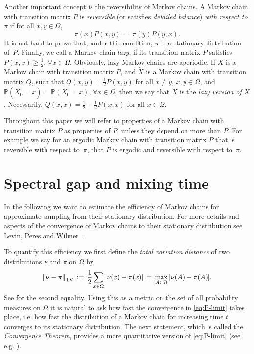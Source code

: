 \documentclass{dis}
\theoremstyle{citing}
\begin{document}
Another important concept is the reversibility of Markov chains. 
A Markov chain with transition matrix $P$ is 
\emph{reversible} 
(or satisfies {\it detailed balance}) 
\emph{with respect to $\pi$} if for all $x,y\in{\Omega}$,
\[
\pi(x) P(x,y) \,=\, \pi(y) P(y,x).
\]
It is not hard to prove that, under this condition, $\pi$ is 
a stationary distribution of~$P$.
Finally, we call a Markov chain \emph{lazy}, if its transition 
matrix $P$ satisfies $P(x,x)\ge\frac12$, $\forall x\in{\Omega}$. 
Obviously, lazy Markov chains are aperiodic. 
If $X$ is a Markov chain with transition matrix $P$, 
and ${\widetilde{{X}}}$ is a Markov chain with transition matrix $Q$, 
such that $Q(x,y)=\frac12 P(x,y)$ for all $x\neq y$, 
$x,y\in{\Omega}$, and ${\mathbb{P}}({\widetilde{{X}}}_0=x)={\mathbb{P}}(X_0=x)$, $\forall x\in{\Omega}$, 
then we say that ${\widetilde{{X}}}$ is the \emph{lazy version of} $X$.
Necessarily, $Q(x,x)=\frac12+\frac12 P(x,x)$ for all $x\in{\Omega}$.

Throughout this paper we will refer to properties of a Markov chain 
with transition matrix $P$ as properties of $P$, unless they depend 
on more than $P$. For example we say for an ergodic Markov 
chain with transition matrix $P$ that is reversible with respect 
to~$\pi$, that $P$ is ergodic and reversible with 
respect to~$\pi$.

\section{Spectral gap and mixing time} \label{sec:2_gap}

In the following we want to estimate the efficiency of  
Markov chains for approximate sampling from their stationary 
distribution. 
For more details and aspects of the convergence 
of Markov chains to their stationary distribution see Levin, Peres 
and Wilmer~\cite{LPW}.

To quantify this efficiency we first define 
the \emph{total variation distance} 
of two distributions $\nu$ and $\pi$ on ${\Omega}$ by
\[
{\left\Vert {\nu-\pi} \right\Vert_{\rm TV}} \,:=\, \frac12\sum_{x\in{\Omega}}{\left\vert {\nu(x)-\pi(x)} \right\vert} 
	\,=\, \max_{A\subset{\Omega}} {\left\vert {\nu(A)-\pi(A)} \right\vert}.
\]
See \cite[Prop.~4.2]{LPW} for the second equality.
Using this as a metric on the set of all probability measures 
on ${\Omega}$ it is natural to ask how fast the convergence 
in \eqref{eq:P-limit} takes place, i.e. how fast the distribution 
of a Markov chain for increasing time $t$ converges to its 
stationary distribution.
The next statement, which is called the \emph{Convergence Theorem}, 
provides a more quantitative version of \eqref{eq:P-limit} 
(see e.g. \cite[Theorem~4.9]{LPW}).
\end{document}

